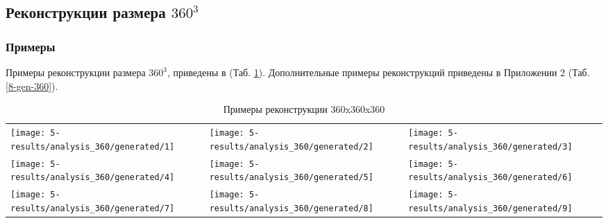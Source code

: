 
	\subsection{Реконструкции размера $360^3$}
		\subsubsection{Примеры}
			Примеры реконструкции размера $360^3$, приведены в (Таб. \ref{5-gen-360}). Дополнительные примеры реконструкций приведены в Приложении 2 (Таб. \ref{8-gen-360}).
			
			\begin{table}[h]
				\centering
				\begin{tabular}{p{5cm} p{5cm} p{5cm}}
					\toprule
					\texttt{[image: 5-results/analysis\_360/generated/1]}
					&
					\texttt{[image: 5-results/analysis\_360/generated/2]}
					&
					\texttt{[image: 5-results/analysis\_360/generated/3]}
					\\
					\texttt{[image: 5-results/analysis\_360/generated/4]}
					&
					\texttt{[image: 5-results/analysis\_360/generated/5]}
					&
					\texttt{[image: 5-results/analysis\_360/generated/6]}
					\\
					\texttt{[image: 5-results/analysis\_360/generated/7]}
					&
					\texttt{[image: 5-results/analysis\_360/generated/8]}
					&
					\texttt{[image: 5-results/analysis\_360/generated/9]}
					\\
					\bottomrule
				\end{tabular}
				\caption{Примеры реконструкции 360x360x360}
				\label{5-gen-360}
			\end{table} 
	
